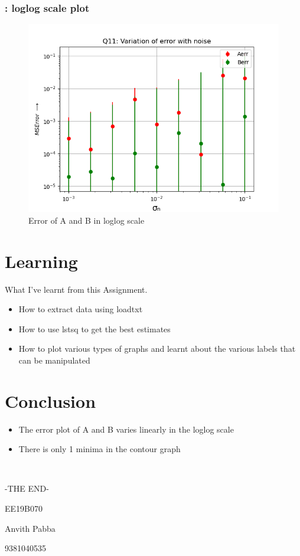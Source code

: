 \documentclass[11pt]{article}
\begin{document}
\subsubsection{: loglog scale plot}
\begin{figure}[H]
    \centering
    \includegraphics[scale = 0.75]{Figure_5.png}
    \caption{Error of A and B in loglog scale}
\end{figure}

\section{Learning}
What I've learnt from this Assignment.
\begin{itemize}
    \item How to extract data using loadtxt
    \item How to use lstsq to get the best estimates
    \item How to plot various types of graphs and learnt about the various labels that can be manipulated
\end{itemize}

\section{Conclusion}
\begin{itemize}
    \item The error plot of A and B varies linearly in the loglog scale
    \item There is only 1 minima in the contour graph
\end{itemize}

\begin{textbf}\\
\centerline{-THE END-}
\centerline{EE19B070}
\centerline{Anvith Pabba}
\centerline{9381040535}
\end{textbf}
\end{document}
